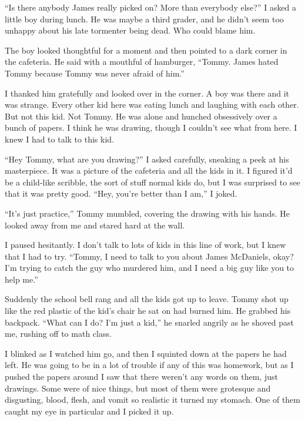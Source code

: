 ``Is there anybody James really picked on? More than everybody
else?'' I asked a little boy during lunch. He was maybe a
third grader, and he didn't seem too unhappy about his late
tormenter being dead. Who could blame him.



The boy looked thoughtful for a moment and then pointed to a dark
corner in the cafeteria. He said with a mouthful of hamburger,
``Tommy. James hated Tommy because Tommy was never afraid of
him.''



I thanked him gratefully and looked over in the corner. A boy was
there and it was strange. Every other kid here was eating lunch and
laughing with each other. But not this kid. Not Tommy. He was alone
and hunched obsessively over a bunch of papers. I think he was
drawing, though I couldn't see what from here. I knew I had
to talk to this kid.



``Hey Tommy, what are you drawing?'' I asked carefully,
sneaking a peek at his masterpiece. It was a picture of the
cafeteria and all the kids in it. I figured it'd be a
child-like scribble, the sort of stuff normal kids do, but I was
surprised to see that it was pretty good. ``Hey, you're
better than I am,'' I joked.



``It's just practice,'' Tommy mumbled, covering the drawing with his
hands. He looked away from me and stared hard at the wall.



I paused hesitantly. I don't talk to lots of kids in this
line of work, but I knew that I had to try. ``Tommy, I need to
talk to you about James McDaniels, okay? I'm trying to catch
the guy who murdered him, and I need a big guy like you to help
me.''



Suddenly the school bell rang and all the kids got up to leave.
Tommy shot up like the red plastic of the kid's chair he sat
on had burned him. He grabbed his backpack. ``What can I do?
I'm just a kid,'' he snarled angrily as he shoved past
me, rushing off to math class.



I blinked as I watched him go, and then I squinted down at the
papers he had left. He was going to be in a lot of trouble if any
of this was homework, but as I pushed the papers around I saw that
there weren't any words on them, just drawings. Some were of
nice things, but most of them were grotesque and disgusting, blood,
flesh, and vomit so realistic it turned my stomach. One of them
caught my eye in particular and I picked it up.



